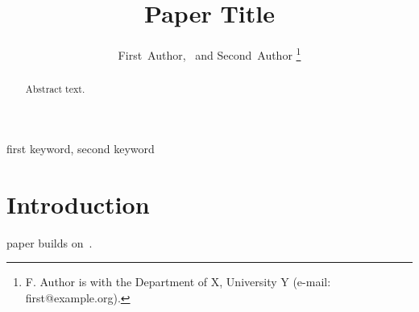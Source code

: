 \documentclass[journal]{IEEEtran}
\begin{document}
\title{Paper Title}
\author{First~Author,~ and Second~Author%
\thanks{F. Author is with the Department of X, University Y (e-mail: first@example.org).}}
\maketitle
\begin{abstract}
Abstract text.
\end{abstract}
\begin{IEEEkeywords}
first keyword, second keyword
\end{IEEEkeywords}
\section{Introduction}
 paper builds on~\cite{knuth1984literate}.


\end{document}
